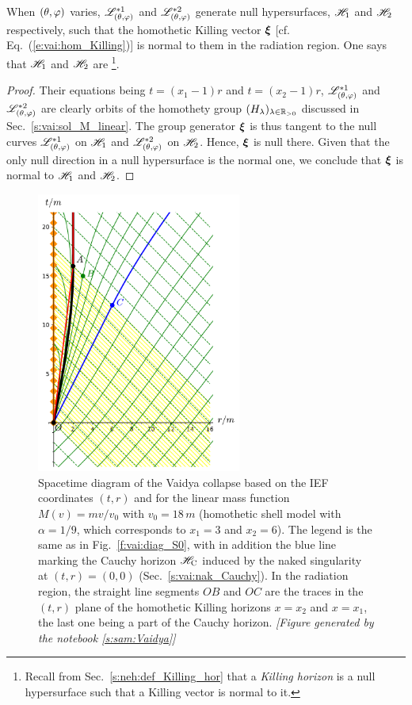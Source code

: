 \begin{greybox}
When $(\theta,\varphi)$ varies, $\mathscr{L}^{*1}_{(\theta,\varphi)}$ and $\mathscr{L}^{*2}_{(\theta,\varphi)}$
generate null hypersurfaces, $\mathscr{H}_1$ and $\mathscr{H}_2$ respectively,
such that the homothetic Killing vector $\bm{\xi}$
[cf. Eq.~(\ref{e:vai:hom_Killing})] is normal to them
in the radiation region. One says that $\mathscr{H}_1$ and $\mathscr{H}_2$
are
\footnote{Recall from Sec.~\ref{s:neh:def_Killing_hor} that
a \emph{Killing horizon} is a null hypersurface such that a Killing vector is normal to it.}.
\end{greybox}
\begin{proof}
Their equations being $t=(x_1 - 1)r$ and $t=(x_2 - 1)r$, $ \mathscr{L}^{*1}_{(\theta,\varphi)}$ and
$ \mathscr{L}^{*2}_{(\theta,\varphi)}$ are clearly orbits of the
homothety group $(H_\lambda)_{\lambda\in \mathbb{R}_{>0}}$ discussed in Sec.~\ref{s:vai:sol_M_linear}.
The group generator $\bm{\xi}$ is thus tangent to the null curves $\mathscr{L}^{*1}_{(\theta,\varphi)}$ on $\mathscr{H}_1$
and $\mathscr{L}^{*2}_{(\theta,\varphi)}$ on $\mathscr{H}_2$. Hence,
$\bm{\xi}$ is null there. Given that the
only null direction in a null hypersurface is the normal one, we conclude
that  $\bm{\xi}$ is normal to $\mathscr{H}_1$ and $\mathscr{H}_2$.
\end{proof}

\begin{figure}
\centerline{\includegraphics[width=0.6\textwidth]{vai_diag_naked_S0.pdf}}
\caption[]{\label{f:vai:diag_naked_S0} \footnotesize
Spacetime diagram of the Vaidya collapse based on the IEF coordinates $(t, r)$
and for the linear mass function $M(v)=m v/v_0$ with $v_0 = 18\, m$
(homothetic shell model with $\alpha = 1/9$,
which corresponds to $x_1 = 3$ and $x_2 = 6$).
The legend is the same as in Fig.~\ref{f:vai:diag_S0}, with in addition
the blue line marking the Cauchy horizon $\mathscr{H}_{\rm C}$ induced by the naked singularity
at $(t,r) = (0,0)$ (Sec.~\ref{s:vai:nak_Cauchy}).
In the radiation region, the straight line segments
$OB$ and $OC$ are the traces in the $(t,r)$ plane of the homothetic Killing horizons $x=x_2$ and $x=x_1$, the last one being a
part of the Cauchy horizon.
\textsl{[Figure generated by the notebook \ref{s:sam:Vaidya}]}
}
\end{figure}

